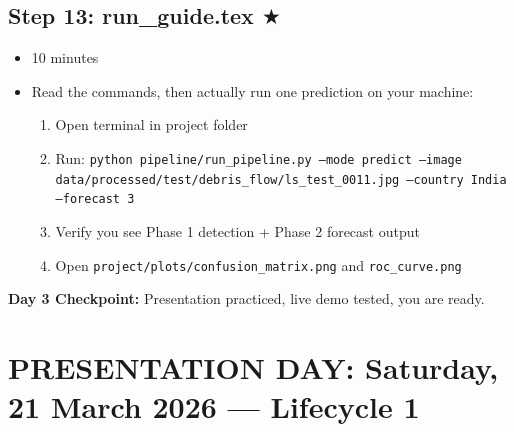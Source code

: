 \documentclass[12pt,a4paper]{article}
\begin{document}
\subsection*{Step 13: run\_guide.tex $\bigstar$}
\begin{itemize}[leftmargin=1.5cm]
    \item[\textbf{Time:}] 10 minutes
    \item[\textbf{Action:}] Read the commands, then actually run one prediction on your machine:
    \begin{enumerate}
        \item Open terminal in project folder
        \item Run: \texttt{python pipeline/run\_pipeline.py --mode predict --image data/processed/test/debris\_flow/ls\_test\_0011.jpg --country India --forecast 3}
        \item Verify you see Phase 1 detection + Phase 2 forecast output
        \item Open \texttt{project/plots/confusion\_matrix.png} and \texttt{roc\_curve.png}
    \end{enumerate}
\end{itemize}

\vspace{0.3cm}
\noindent\textbf{Day 3 Checkpoint:} Presentation practiced, live demo tested, you are ready.

\section{PRESENTATION DAY: Saturday, 21 March 2026 --- Lifecycle 1}

\noindent{}
\end{document}
